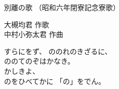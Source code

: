 \documentclass[10pt,b5j]{tarticle} %
\begin{document}
\begin{minipage}[c]{0.7\hsize} %
    \begin{center}
        {\LARGE
            別離の歌 %
        }
        {\small 
            （昭和六年閉寮記念寮歌） %
        }
    \end{center}
\end{minipage}
\begin{minipage}[c]{0.3\hsize} %
    \begin{flushright} %
        大槻均君 作歌\\中村小弥太君 作曲 %
    \end{flushright}
\end{minipage}

\vspace{1.5em} %
\newcommand{\linespace}{0.5em} %
\newcommand{\blocksize}{0.33\hsize} %
\newcommand{\itemmargin}{3em} %

\vspace{\linespace}
すらにをず、
ののれのきざるに、\\
ののてのぞはかなき。\\
かしきよ、\\
のをひべてかに
「の」をでん。
\end{document}

